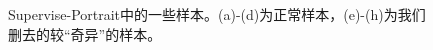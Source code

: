 \documentclass[11pt]{article}
\begin{document}
\begin{figure}[!h]
{\begin{minipage}[t]{0.2\linewidth}
  \end{minipage}%
  }%
  \centering
  \caption{Supervise-Portrait中的一些样本。(a)-(d)为正常样本，(e)-(h)为我们删去的较“奇异”的样本。}
\label{fig:6}
\end{figure}
\end{document}
